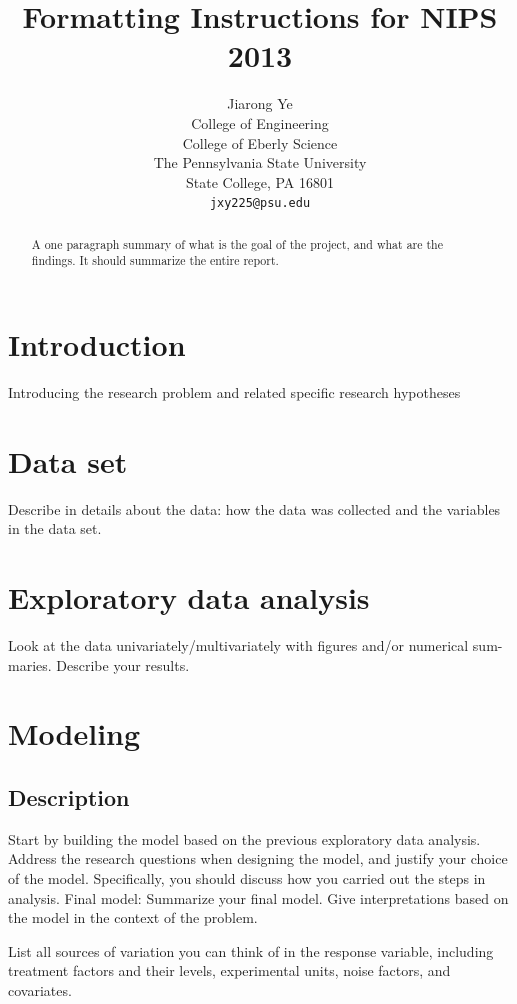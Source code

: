 \documentclass{article} %
\title{Formatting Instructions for NIPS 2013}
\author{
Jiarong Ye \\
College of Engineering\\
College of Eberly Science\\
The Pennsylvania State University\\
State College, PA 16801 \\
\texttt{jxy225@psu.edu} \\
}
\begin{document}
\maketitle

\begin{abstract}
A one paragraph summary of what is the goal of the project, and what are the findings. It should summarize the entire report.
\end{abstract}

\section{Introduction}



Introducing the research problem and related specific research hypotheses 




\section{Data set}


Describe in details about the data: how the data was collected and the variables in the data set.

\section{Exploratory data analysis}

Look at the data univariately/multivariately with figures and/or numerical sum- maries. Describe your results.



\section{Modeling}


\subsection{Description}
Start by building the model based on the previous exploratory data analysis. Address the research questions when designing the model, and justify your choice of the model. Specifically, you should discuss how you carried out the steps in analysis. Final model: Summarize your final model. Give interpretations based on the model in the context of the problem.


List all sources of variation you can think of in the response variable, including treatment factors and their levels, experimental units, noise factors, and covariates.
\end{document}
